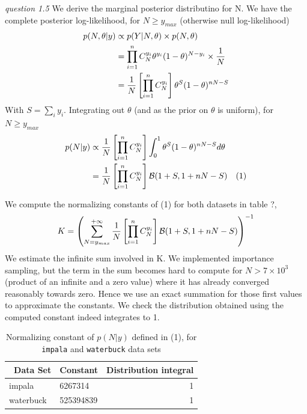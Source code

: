 \documentclass[twoside]{article}
\begin{document}
\vspace{.2 in}
\textit{question 1.5} We derive the marginal posterior distributino for N. We have the complete posterior log-likelihood,  for $N \geqslant y_{max}$ (otherwise null log-likelihood)
\begin{align*}
p(N, \theta | y) & \propto p(Y | N, \theta) \times p(N, \theta)\\
& = \prod_{i = 1}^{n} C_{N}^{y_i} \* \theta^{y_i} \* (1 - \theta)^{N - y_i} \times \frac{1}{N}\\
& = \frac{1}{N} \* \left[ \prod_{i = 1}^{n} C_{N}^{y_i} \right] \* \theta^{S} \* (1 - \theta)^{n \* N - S}\\
\end{align*}
With $ S = \sum_i y_i$. Integrating out $\theta$ (and as the prior on $\theta$ is uniform), for $N \geqslant y_{max}$
\begin{align*}
p(N | y) & \propto \frac{1}{N} \* \left[ \prod_{i = 1}^{n} C_{N}^{y_i} \right] \* \int_0^1 \theta^{S} \* (1 - \theta)^{n \* N - S} d\theta \\
& = \frac{1}{N} \* \left[ \prod_{i = 1}^{n} C_{N}^{y_i} \right] \* \mathcal{B} (1 + S, 1 + n \* N - S) \quad (1)\\
\end{align*}

We compute the normalizing constants of (1) for both datasets in table ?,
\begin{align*}
K = \left( \sum_{N = y_{max}}^{+ \infty} \frac{1}{N} \* \left[ \prod_{i = 1}^{n} C_{N}^{y_i} \right] \* \mathcal{B} (1 + S, 1 + n \* N - S) \right)^{-1}
\end{align*}
We estimate the infinite sum involved in K. We implemented importance sampling, but the term in the sum becomes hard to compute for $N > 7 \times 10^3$ (product of an infinite and a zero value) where it has already converged reasonably towards zero. Hence we use an exact summation for those first values to approximate the constants. We check the distribution obtained using the computed constant indeed integrates to 1.

\begin{table}[H]
\caption{Normalizing constant of $p(N|y)$ defined in (1), for \texttt{impala} and \texttt{waterbuck} data sets}
\centering
\begin{tabular}{llr}
\toprule\
Data Set & Constant & Distribution integral \\
\midrule
impala & 6267314 & 1 \\
waterbuck & 525394839 & 1\\
\bottomrule
\end{tabular}
\end{table}
\end{document}

